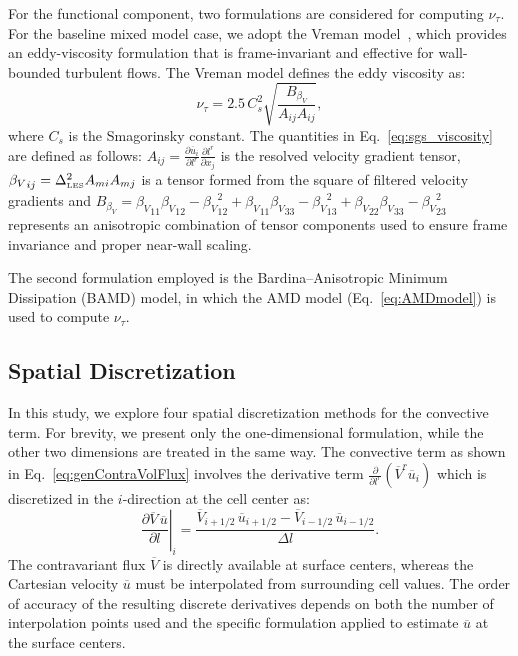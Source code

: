 \documentclass[final,3p]{elsarticle}
\begin{document}
For the functional component, two formulations are considered for computing \( \nu_\tau \). For the baseline mixed model case, we adopt the Vreman model~\cite{vreman2004}, which provides an eddy-viscosity formulation that is frame-invariant and effective for wall-bounded turbulent flows. The Vreman model defines the eddy viscosity as:
\begin{equation}
    \nu_{\tau} = 2.5\,C_s^2 \sqrt{ \frac{B_{\beta_V}}{{A}_{ij} A_{ij}} },
    \label{eq:sgs_viscosity}
\end{equation}
where $C_s$ is the Smagorinsky constant. The quantities in Eq.~\eqref{eq:sgs_viscosity} are defined as follows: $A_{ij} = \frac{\partial \overline{u}_i}{\partial l^r} \frac{\partial l^r}{\partial x_j}$ is the resolved velocity gradient tensor, ${\beta_V}_{ij} = \Delta_{\hbox{\tiny LES}}^2 A_{mi} A_{mj}$ is a tensor formed from the square of filtered velocity gradients and $B_{\beta_V} = {\beta_V}_{11} {\beta_V}_{12} - {\beta_V}_{12}^2 + {\beta_V}_{11} {\beta_V}_{33} - {\beta_V}_{13}^2 + {\beta_V}_{22} {\beta_V}_{33} - {\beta_V}_{23}^2$ represents an anisotropic combination of tensor components used to ensure frame invariance and proper near-wall scaling.


The second formulation employed is the Bardina--Anisotropic Minimum Dissipation (BAMD) model, in which the AMD model (Eq.~\ref{eq:AMDmodel}) is used to compute \( \nu_\tau \).

\subsection{Spatial Discretization} \label{section:SpatialSchemes}
In this study, we explore four spatial discretization methods for the convective term. For brevity, we present only the one‑dimensional formulation, while the other two dimensions are treated in the same way. The convective term as shown in Eq.~\ref{eq:genContraVolFlux} involves the derivative term $\frac{\partial}{\partial l^r}(\overline{V}^r \overline{u}_i)$ which is discretized in the $i$-direction at the cell center as:
\begin{equation}
	\left.\frac{\partial \overline{V}\,\overline{u}}{\partial l}\right|_{i}
	=
	\frac{\overline{V}_{i+1/2}\,\overline{u}_{i+1/2} - \overline{V}_{i-1/2}\,\overline{u}_{i-1/2}}
	{\Delta l}.
\end{equation}
The contravariant flux $\overline{V}$ is directly available at surface centers, whereas the Cartesian velocity $\overline{u}$ must be interpolated from surrounding cell values. The order of accuracy of the resulting discrete derivatives depends on both the number of interpolation points used and the specific formulation applied to estimate $\overline{u}$ at the surface centers.
\end{document}
